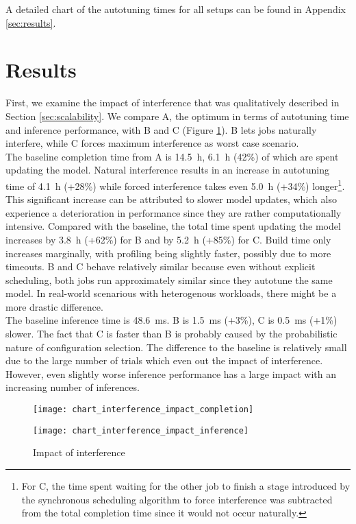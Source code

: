 A detailed chart of the autotuning times for all setups can be found in Appendix \ref{sec:results}.

\section{Results}
First, we examine the impact of interference that was qualitatively described in Section \ref{sec:scalability}. We compare A, the optimum in terms of autotuning time and inference performance, with B and C (Figure \ref{fig:chart-interference-impact}). B lets jobs naturally interfere, while C forces maximum interference as worst case scenario.\\
The baseline completion time from A is \SI{14.5}{\hour}, \SI{6.1}{\hour} (42\%) of which are spent updating the model. Natural interference results in an increase in autotuning time of \SI{4.1}{\hour} (+28\%) while forced interference takes even \SI{5.0}{\hour} (+34\%) longer\footnote{For C, the time spent waiting for the other job to finish a stage introduced by the synchronous scheduling algorithm to force interference was subtracted from the total completion time since it would not occur naturally.}. This significant increase can be attributed to slower model updates, which also experience a deterioration in performance since they are rather computationally intensive. Compared with the baseline, the total time spent updating the model increases by \SI{3.8}{\hour} (+62\%) for B and by \SI{5.2}{\hour} (+85\%) for C. Build time only increases marginally, with profiling being slightly faster, possibly due to more timeouts. B and C behave relatively similar because even without explicit scheduling, both jobs run approximately similar since they autotune the same model. In real-world scenarious with heterogenous workloads, there might be a more drastic difference.\\
The baseline inference time is \SI{48.6}{\milli\second}. B is \SI{1.5}{\milli\second} (+3\%), C is \SI{0.5}{\milli\second} (+1\%) slower. The fact that C is faster than B is probably caused by the probabilistic nature of configuration selection. The difference to the baseline is relatively small due to the large number of trials which even out the impact of interference. However, even slightly worse inference performance has a large impact with an increasing number of inferences.

\begin{figure}[ht]
	\begin{minipage}[b]{.6\textwidth}
		\centering\texttt{[image: chart\_interference\_impact\_completion]}
		\label{fig:chart-interference-impact-completion}
	\end{minipage}%
	\hfill
	\begin{minipage}[b]{.35\textwidth}
		\centering\texttt{[image: chart\_interference\_impact\_inference]}
		\label{fig:chart-interference-impact-inference}
	\end{minipage}
	\caption{Impact of interference}
	\label{fig:chart-interference-impact}
\end{figure}

